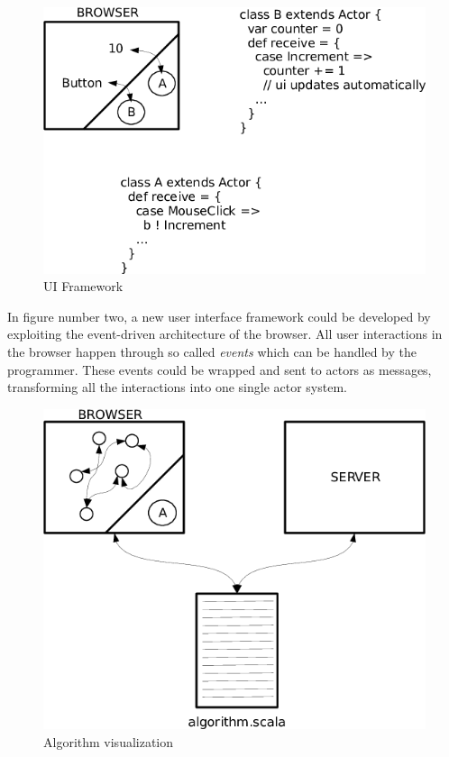 \documentclass{sig-alternate}
\begin{document}
\begin{figure}
\centering
\includegraphics[scale=0.2]{2.png}
\caption{UI Framework}
\label{fig:ui}
\end{figure}

In figure number two, a new user interface framework could be developed by exploiting the event-driven
architecture of the browser. All user interactions in the browser happen through so called \emph{events}
which can be handled by the programmer. These events could be wrapped and sent to actors as messages,
transforming all the interactions into one single actor system.

\begin{figure}
\centering
\includegraphics[scale=0.3]{3.png}
\caption{Algorithm visualization}
\label{fig:algorithm}
\end{figure}
\end{document}
